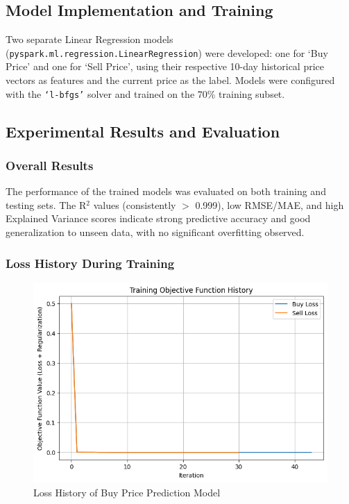 \subsection{Model Implementation and Training}
\label{subsec:model-implementation-and-training}

Two separate Linear Regression models (\texttt{pyspark.ml.regression.LinearRegression}) were developed: one for `Buy Price' and one for `Sell Price', using their respective 10-day historical price vectors as features and the current price as the label.
Models were configured with the \texttt{`l-bfgs'} solver and trained on the 70\% training subset.

\subsection{Experimental Results and Evaluation}
\label{subsec:experimental-results-and-evaluation}

\subsubsection{Overall Results}\text{}

The performance of the trained models was evaluated on both training and testing sets.
The R$^2$ values (consistently $>$ 0.999), low RMSE/MAE, and high Explained Variance scores indicate strong predictive accuracy and good generalization to unseen data, with no significant overfitting observed.

\smallskip

\subsubsection{Loss History During Training}\text{}


\begin{figure}[H]
    \centering
    \includegraphics[width=0.8\linewidth]{images/loss_history}
    \caption{Loss History of Buy Price Prediction Model}
    \label{fig:buy_price_model_loss}
\end{figure}


